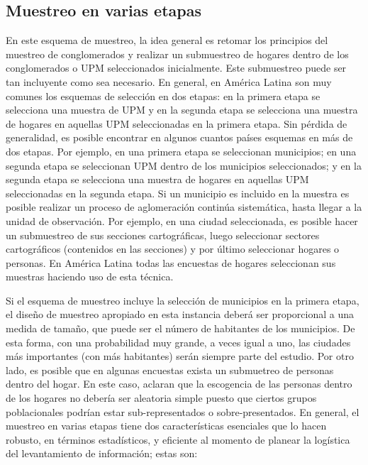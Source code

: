 \documentclass[12pt,spanish,]{book}
\begin{document}
\hypertarget{muestreo-en-varias-etapas}{%
\subsection*{Muestreo en varias etapas}\label{muestreo-en-varias-etapas}}

En este esquema de muestreo, la idea general es retomar los principios del muestreo de conglomerados y realizar un submuestreo de hogares dentro de los conglomerados o UPM seleccionados inicialmente. Este submuestreo puede ser tan incluyente como sea necesario. En general, en América Latina son muy comunes los esquemas de selección en dos etapas: en la primera etapa se selecciona una muestra de UPM y en la segunda etapa se selecciona una muestra de hogares en aquellas UPM seleccionadas en la primera etapa. Sin pérdida de generalidad, es posible encontrar en algunos cuantos países esquemas en más de dos etapas. Por ejemplo, en una primera etapa se seleccionan municipios; en una segunda etapa se seleccionan UPM dentro de los municipios seleccionados; y en la segunda etapa se selecciona una muestra de hogares en aquellas UPM seleccionadas en la segunda etapa. Si un municipio es incluido en la muestra es posible realizar un proceso de aglomeración continúa sistemática, hasta llegar a la unidad de observación. Por ejemplo, en una ciudad seleccionada, es posible hacer un submuestreo de sus secciones cartográficas, luego seleccionar sectores cartográficos (contenidos en las secciones) y por último seleccionar hogares o personas. En América Latina todas las encuestas de hogares seleccionan sus muestras haciendo uso de esta técnica.

Si el esquema de muestreo incluye la selección de municipios en la primera etapa, el diseño de muestreo apropiado en esta instancia deberá ser proporcional a una medida de tamaño, que puede ser el número de habitantes de los municipios. De esta forma, con una probabilidad muy grande, a veces igual a uno, las ciudades más importantes (con más habitantes) serán siempre parte del estudio. Por otro lado, es posible que en algunas encuestas exista un submuetreo de personas dentro del hogar. En este caso, \textcite{Clark_Steel_2007} aclaran que la escogencia de las personas dentro de los hogares no debería ser aleatoria simple puesto que ciertos grupos poblacionales podrían estar sub-representados o sobre-presentados. En general, el muestreo en varias etapas tiene dos características esenciales que lo hacen robusto, en términos estadísticos, y eficiente al momento de planear la logística del levantamiento de información; estas son:
\end{document}
